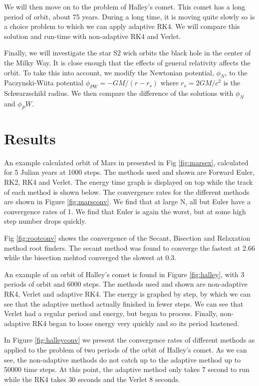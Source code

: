 \documentclass{article}
\begin{document}
We will then move on to the problem of Halley's comet. This comet has a long period of orbit, about 75 years. During a long time, it is moving quite slowly so is a choice problem to which we can apply adaptive RK4. We will compare this solution and run-time with non-adaptive RK4 and Verlet. 

Finally, we will investigate the star S2 wich orbits the black hole in the center of the Milky Way. It is close enough that the effects of general relativity affects the orbit. To take this into account, we modify the Newtonian potential, $\phi_N$, to the Paczynski-Wiita potential $\phi_{PW} = -GM/(r-r_s)$ where $r_s = 2GM/c^2$ is the Schwarzschild radius. We then compare the difference of the solutions with $\phi_N$ and $\phi_PW$. 

\section*{Results}

An example calculated orbit of Mars in presented in Fig \ref{fig:marsex}, calculated for 5 Julian years at 1000 steps. The methods used and shown are Forward Euler, RK2, RK4 and Verlet. The energy time graph is displayed on top while the track of each method is shown below. The convergence rates for the different methods are shown in Figure \ref{fig:marsconv}. We find that at large N, all but Euler have a convergence rates of 1. We find that Euler is again the worst, but at some high step number drops quickly. 

Fig \ref{fig:rootconv} shows the convergence of the Secant, Bisection and Relaxation method root finders. The secant method was found to converge the fastest at 2.66 while the bisection mehtod converged the slowest at 0.3. 

An example of an orbit of Halley's comet is found in Figure \ref{fig:halley}, with 3 periods of orbit and 6000 steps. The methods used and shown are non-adaptive RK4, Verlet and adaptive RK4. The energy is graphed by step, by which we can see that the adaptive method actually finished in fewer steps. We can see that Verlet had a regular period and energy, but began to process. Finally, non-adaptive RK4 began to loose energy very quickly and so its period hastened. 

In Figure \ref{fig:halleyconv} we present the convergence rates of different methods as applied to the problem of two periods of the orbit of Halley's comet. As we can see, the non-adaptive methods do not catch up to the adaptive method up to 50000 time steps. At this point, the adaptive method only takes 7 second to run while the RK4 takes 30 seconds and the Verlet 8 seconds. 
\end{document}

